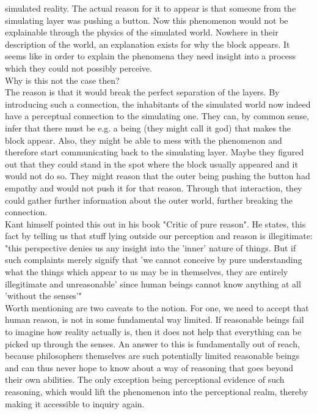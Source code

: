 \documentclass[fleqn,14pt]{article}
\begin{document}
simulated reality. The actual reason for it to appear is that someone from the simulating layer
was pushing a button. Now this phenomenon would not be explainable through the physics of the simulated world.
Nowhere in their description of the world, an explanation
exists for why the block appears. It seems like in order to explain the phenomena they need insight into
a process which they could not possibly perceive. \\
Why is this not the case then? \\
The reason is that it would break the perfect separation of the layers. By introducing such
a connection, the inhabitants of the simulated world now indeed have a perceptual connection to the simulating
one. They can, by common sense, infer that there must be e.g. a being (they might call it god) that
makes the block appear. Also, they might be able to mess with the phenomenon and therefore start communicating
back to the simulating layer. Maybe they figured out that they could stand in the spot where
the block usually appeared and it would not do so. They might reason that the outer being pushing the button 
had empathy and would not push it for that reason. Through that interaction, they could gather further information
about the outer world, further breaking the connection. \\

Kant himself pointed this out in his book "Critic of pure reason". He states, this fact by telling
us that stuff lying outside our perception and reason is illegitimate: "this perspective
denies us any insight into the 'inner' nature of things. But if such complaints merely signify that 'we cannot conceive by pure understanding
what the things which appear to us may be in themselves, they are
entirely illegitimate and unreasonable' since human beings cannot
know anything at all 'without the senses'"\cite[p.49]{otfried} \\

Worth mentioning are two caveats to the notion. For one, we need to accept that human reason,
is not in some fundamental way limited. If reasonable
beings fail to imagine how reality actually is, then it does not help that everything
can be picked up through the senses. An answer to this is fundamentally out of reach, because
philosophers themselves are such potentially limited reasonable beings and can thus never hope
to know about a way of reasoning that goes beyond their own abilities. The only exception being
perceptional evidence of such reasoning, which would lift the phenomenon into the perceptional realm,
thereby making it accessible to inquiry again. \\
\end{document}
